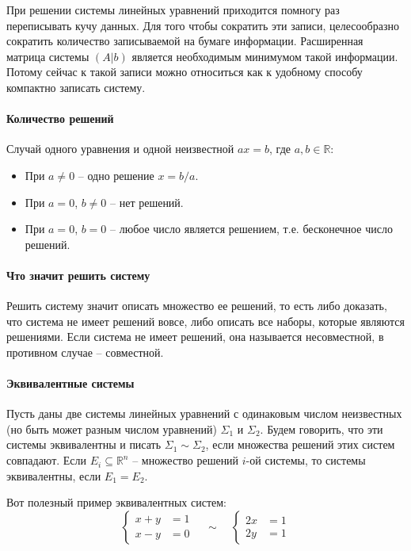 При решении системы линейных уравнений приходится помногу раз переписывать кучу данных. Для того чтобы сократить эти записи, целесообразно сократить количество записываемой на бумаге информации.
Расширенная матрица системы $(A|b)$ является необходимым минимумом такой информации.
Потому сейчас к такой записи можно относиться как к удобному способу компактно записать систему.

\paragraph{Количество решений}

Случай одного уравнения и одной неизвестной $ax = b$, где $a, b\in \mathbb R$:
\begin{itemize}
\item При $a\neq 0$ -- одно решение $x = b/a$.

\item При $a = 0$, $b\neq 0$ -- нет решений.

\item При $a = 0$, $b = 0$ -- любое число является решением, т.е. бесконечное число решений.
\end{itemize}

\paragraph{Что значит решить систему}

Решить систему значит описать множество ее решений, то есть либо доказать, что система не имеет решений вовсе, либо описать все наборы, которые являются решениями.
Если система не имеет решений, она называется несовместной, в противном случае -- совместной.

\paragraph{Эквивалентные системы}

Пусть даны две системы линейных уравнений с одинаковым числом неизвестных (но быть может разным числом уравнений) $\Sigma_1$ и $\Sigma_2$.
Будем говорить, что эти системы эквивалентны и писать $\Sigma_1 \sim \Sigma_2$, если множества решений этих систем совпадают.
Если $E_i\subseteq \mathbb R^n$ -- множество решений $i$-ой системы, то системы эквивалентны, если $E_1 = E_2$.

Вот полезный пример эквивалентных систем:
\[
\left\{
\begin{aligned}
x + y &= 1\\
x - y &= 0
\end{aligned}
\right.\quad\sim\quad
\left\{
\begin{aligned}
2x &= 1\\
2y &= 1
\end{aligned}
\right.
\]

